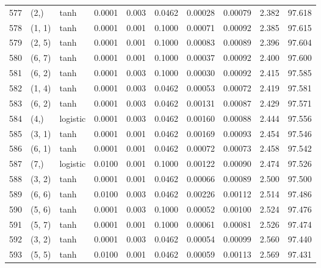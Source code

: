 \begin{tabular}{lllrrrrrrr}
577 &        (2,) &      tanh &  0.0001 &  0.003 &  0.0462 &          0.00028 &    0.00079 &       2.382 &    97.618 \\
578 &      (1, 1) &      tanh &  0.0001 &  0.001 &  0.1000 &          0.00071 &    0.00092 &       2.385 &    97.615 \\
579 &      (2, 5) &      tanh &  0.0001 &  0.001 &  0.1000 &          0.00083 &    0.00089 &       2.396 &    97.604 \\
580 &      (6, 7) &      tanh &  0.0001 &  0.001 &  0.1000 &          0.00037 &    0.00092 &       2.400 &    97.600 \\
581 &      (6, 2) &      tanh &  0.0001 &  0.003 &  0.1000 &          0.00030 &    0.00092 &       2.415 &    97.585 \\
582 &      (1, 4) &      tanh &  0.0001 &  0.003 &  0.0462 &          0.00053 &    0.00072 &       2.419 &    97.581 \\
583 &      (6, 2) &      tanh &  0.0001 &  0.003 &  0.0462 &          0.00131 &    0.00087 &       2.429 &    97.571 \\
584 &        (4,) &  logistic &  0.0001 &  0.003 &  0.0462 &          0.00160 &    0.00088 &       2.444 &    97.556 \\
585 &      (3, 1) &      tanh &  0.0001 &  0.001 &  0.0462 &          0.00169 &    0.00093 &       2.454 &    97.546 \\
586 &      (6, 1) &      tanh &  0.0001 &  0.001 &  0.0462 &          0.00072 &    0.00073 &       2.458 &    97.542 \\
587 &        (7,) &  logistic &  0.0100 &  0.001 &  0.1000 &          0.00122 &    0.00090 &       2.474 &    97.526 \\
588 &      (3, 2) &      tanh &  0.0001 &  0.001 &  0.0462 &          0.00066 &    0.00089 &       2.500 &    97.500 \\
589 &      (6, 6) &      tanh &  0.0100 &  0.003 &  0.0462 &          0.00226 &    0.00112 &       2.514 &    97.486 \\
590 &      (5, 6) &      tanh &  0.0001 &  0.003 &  0.1000 &          0.00052 &    0.00100 &       2.524 &    97.476 \\
591 &      (5, 7) &      tanh &  0.0001 &  0.001 &  0.1000 &          0.00061 &    0.00081 &       2.526 &    97.474 \\
592 &      (3, 2) &      tanh &  0.0001 &  0.003 &  0.0462 &          0.00054 &    0.00099 &       2.560 &    97.440 \\
593 &      (5, 5) &      tanh &  0.0100 &  0.001 &  0.0462 &          0.00059 &    0.00113 &       2.569 &    97.431 \\

\end{tabular}
